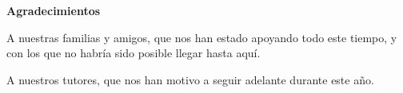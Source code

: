 
\newpage
\begin{center}
{\bf \Huge Agradecimientos}
\end{center}
\vspace{1cm}
\setlength{\baselineskip}{0.8cm}



A nuestras familias y amigos, que nos han estado apoyando todo este tiempo, y con los que no habría sido posible llegar hasta aquí.

A nuestros tutores, que nos han motivo a seguir adelante durante este año.


